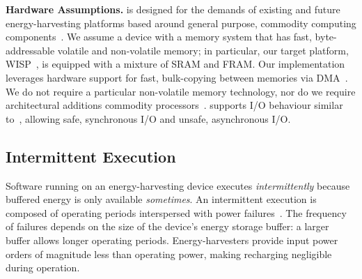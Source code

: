
\textbf{Hardware Assumptions.} \sys is designed for the demands of existing and future energy-harvesting platforms based around general purpose, commodity computing components~\cite{wisp,msp430datasheet}. We assume a device with a memory system that has fast, byte-addressable volatile and non-volatile memory; in particular, our target platform, WISP~\cite{wisp}, is equipped with a mixture of SRAM and FRAM. Our implementation leverages hardware support for fast, bulk-copying between memories via DMA~\cite{msp430datasheet}. We do not require a particular non-volatile memory technology, nor do we require architectural additions commodity processors~\cite{su_date_2017,ratchet,quickrecall,nvp}. \sys supports I/O behaviour similar to~\cite{alpaca,chain}, allowing safe, synchronous I/O and unsafe, asynchronous I/O.

\subsection{Intermittent Execution}
\label{sec:background_consistency}

%
Software running on an energy-harvesting device executes {\em intermittently} because buffered energy is only available \emph{sometimes}. An intermittent execution is composed of operating periods interspersed with power failures~\cite{dino,chain,alpaca,ratchet}. The frequency of failures depends on the size of the device's energy storage buffer: a larger buffer allows longer operating periods. Energy-harvesters provide input power orders of magnitude less than operating power, making recharging negligible during operation.

